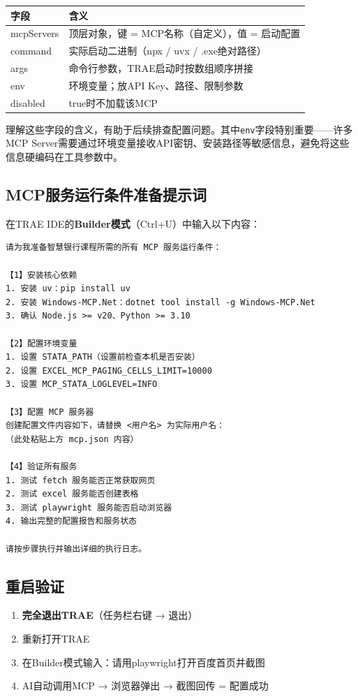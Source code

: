 \begin{table}[H]
\centering
\begin{tabular}{lp{10cm}}
\toprule
\textbf{字段} & \textbf{含义} \\
\midrule
mcpServers & 顶层对象，键 = MCP名称（自定义），值 = 启动配置 \\
command & 实际启动二进制（npx / uvx / .exe绝对路径） \\
args & 命令行参数，TRAE启动时按数组顺序拼接 \\
env & 环境变量；放API Key、路径、限制参数 \\
disabled & true时不加载该MCP \\
\bottomrule
\end{tabular}
\end{table}

理解这些字段的含义，有助于后续排查配置问题。其中\texttt{env}字段特别重要——许多MCP Server需要通过环境变量接收API密钥、安装路径等敏感信息，避免将这些信息硬编码在工具参数中。

\subsection{MCP服务运行条件准备提示词}

在TRAE IDE的\textbf{Builder模式}（Ctrl+U）中输入以下内容：

\begin{lstlisting}
请为我准备智慧银行课程所需的所有 MCP 服务运行条件：

【1】安装核心依赖
1. 安装 uv：pip install uv
2. 安装 Windows-MCP.Net：dotnet tool install -g Windows-MCP.Net
3. 确认 Node.js >= v20、Python >= 3.10

【2】配置环境变量
1. 设置 STATA_PATH（设置前检查本机是否安装）
2. 设置 EXCEL_MCP_PAGING_CELLS_LIMIT=10000
3. 设置 MCP_STATA_LOGLEVEL=INFO

【3】配置 MCP 服务器
创建配置文件内容如下，请替换 <用户名> 为实际用户名：
（此处粘贴上方 mcp.json 内容）

【4】验证所有服务
1. 测试 fetch 服务能否正常获取网页
2. 测试 excel 服务能否创建表格
3. 测试 playwright 服务能否启动浏览器
4. 输出完整的配置报告和服务状态

请按步骤执行并输出详细的执行日志。
\end{lstlisting}

\subsection{重启验证}

\begin{enumerate}[leftmargin=2em]
  \item \textbf{完全退出TRAE}（任务栏右键 → 退出）
  \item 重新打开TRAE
  \item 在Builder模式输入：请用playwright打开百度首页并截图
  \item AI自动调用MCP → 浏览器弹出 → 截图回传 = 配置成功
\end{enumerate}

